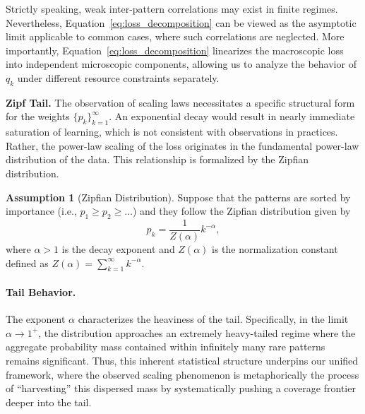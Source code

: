 \documentclass{article}
\theoremstyle{plain}
\theoremstyle{definition}
\newtheorem{assumption}[theorem]{Assumption}
\theoremstyle{remark}
\begin{document}
Strictly speaking, weak inter-pattern correlations may exist in finite regimes. Nevertheless, Equation~\eqref{eq:loss_decomposition} can be viewed as the asymptotic limit applicable to common cases, where such correlations are neglected. More importantly, Equation~\eqref{eq:loss_decomposition} linearizes the macroscopic loss into independent microscopic components, allowing us to analyze the behavior of $q_k$ under different resource constraints separately.

\textbf{Zipf Tail.}
The observation of scaling laws necessitates a specific structural form for the weights $\{p_k\}_{k=1}^\infty$. An exponential decay would result in nearly immediate saturation of learning, which is not consistent with observations in practices. Rather, the power-law scaling of the loss originates in the fundamental power-law distribution of the data. This relationship is formalized by the Zipfian distribution.

\begin{assumption}[Zipfian Distribution]
\label{assump:zipf}
Suppose that the patterns are sorted by importance (i.e., $p_1 \ge p_2 \ge \dots$) and they follow the Zipfian distribution given by
\begin{equation}
    \label{eq:zipf_law}
    p_k = \frac{1}{Z(\alpha)} k^{-\alpha},
\end{equation}
where $\alpha>1$ is the decay exponent and $Z(\alpha)$ is the normalization constant defined as $Z(\alpha) = \sum_{k=1}^\infty k^{-\alpha}$.
\end{assumption}

\paragraph{Tail Behavior.}
The exponent $\alpha$ characterizes the heaviness of the tail. Specifically, in the limit $\alpha \to 1^+$, the distribution approaches an extremely heavy-tailed regime where the aggregate probability mass contained within infinitely many rare patterns remains significant. Thus, this inherent statistical structure underpins our unified framework, where the observed scaling phenomenon is metaphorically the process of “harvesting” this dispersed mass by systematically pushing a coverage frontier deeper into the tail.
\end{document}
